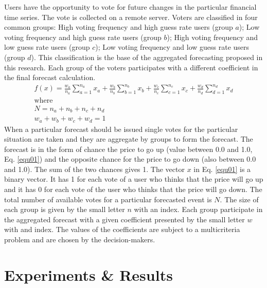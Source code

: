 \documentclass[runningheads]{llncs}
\begin{document}
Users have the opportunity to vote for future changes in the particular financial time series. The vote is collected on a remote server. Voters are classified in four common groups: High voting frequency and high guess rate users (group $a$); Low voting frequency and high guess rate users (group $b$); High voting frequency and low guess rate users (group $c$); Low voting frequency and low guess rate users (group $d$). This classification is the base of the aggregated forecasting proposed in this research. Each group of the voters participates with a different coefficient in the final forecast calculation. 
%
\begin{equation}
\begin{array}{l}
f(x) = \frac{w_{a}}{n_{a}} \sum_{a=1}^{n_{a}} x_{a} + \frac{w_{b}}{n_{b}} \sum_{b=1}^{n_{b}} x_{b} + \frac{w_{c}}{n_{c}} \sum_{c=1}^{n_{c}} x_{c} + \frac{w_{d}}{n_{d}} \sum_{d=1}^{n_{d}} x_{d} \\
\text{where} \\
N = n_{a} + n_{b} + n_{c} + n_{d} \\
w_{a} + w_{b} + w_{c} + w_{d} = 1
\end{array}
\label{equ01}
\end{equation}
%
When a particular forecast should be issued single votes for the particular situation are taken and they are aggregate by groups to form the forecast. The forecast is in the form of chance the price to go up (value between 0.0 and 1.0, Eq. \ref{equ01}) and the opposite chance for the price to go down (also between 0.0 and 1.0). The sum of the two chances gives 1. The vector $x$ in Eq. \ref{equ01} is a binary vector. It has 1 for each vote of a user who thinks that the price will go up and it has 0 for each vote of the user who thinks that the price will go down. The total number of available votes for a particular forecasted event is $N$. The size of each group is given by the small letter $n$ with an index. Each group participate in the aggregated forecast with a given coefficient presented by the small letter $w$ with and index. The values of the coefficients are subject to a multicriteria problem and are chosen by the decision-makers.
%
\section{Experiments \& Results}
%
\end{document}
